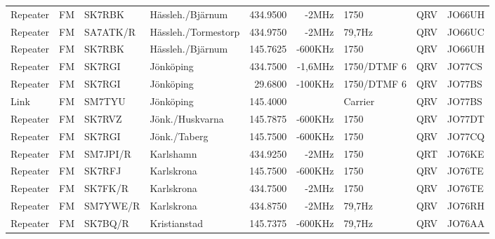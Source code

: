 \begin{landscape}
\begin{longtable}{llllrrlcl}
	Repeater          & FM           & SK7RBK        & Hässleh./Bjärnum    &          434.9500 &          -2MHz & 1750            &       QRV       & JO66UH           \\
	Repeater          & FM           & SA7ATK/R      & Hässleh./Tormestorp &          434.9750 &          -2MHz & 79,7Hz          &       QRV       & JO66UC           \\
	Repeater          & FM           & SK7RBK        & Hässleh./Bjärnum    &          145.7625 &        -600KHz & 1750            &       QRV       & JO66UH           \\
	Repeater          & FM           & SK7RGI        & Jönköping           &          434.7500 &        -1,6MHz & 1750/DTMF 6     &       QRV       & JO77CS           \\
	Repeater          & FM           & SK7RGI        & Jönköping           &           29.6800 &        -100KHz & 1750/DTMF 6     &       QRV       & JO77BS           \\
	Link              & FM           & SM7TYU        & Jönköping           &          145.4000 &                & Carrier         &       QRV       & JO77BS           \\
	Repeater          & FM           & SK7RVZ        & Jönk./Huskvarna     &          145.7875 &        -600KHz & 1750            &       QRV       & JO77DT           \\
	Repeater          & FM           & SK7RGI        & Jönk./Taberg        &          145.7500 &        -600KHz & 1750            &       QRV       & JO77CQ           \\
	Repeater          & FM           & SM7JPI/R      & Karlshamn           &          434.9250 &          -2MHz & 1750            &       QRT       & JO76KE           \\
	Repeater          & FM           & SK7RFJ        & Karlskrona          &          145.7500 &        -600KHz & 1750            &       QRV       & JO76TE           \\
	Repeater          & FM           & SK7FK/R       & Karlskrona          &          434.7500 &          -2MHz & 1750            &       QRV       & JO76TE           \\
	Repeater          & FM           & SM7YWE/R      & Karlskrona          &          434.8750 &          -2MHz & 79,7Hz          &       QRV       & JO76RH           \\
	Repeater          & FM           & SK7BQ/R       & Kristianstad        &          145.7375 &        -600KHz & 79,7Hz          &       QRV       & JO76AA           \\

\end{longtable}
\end{landscape}
